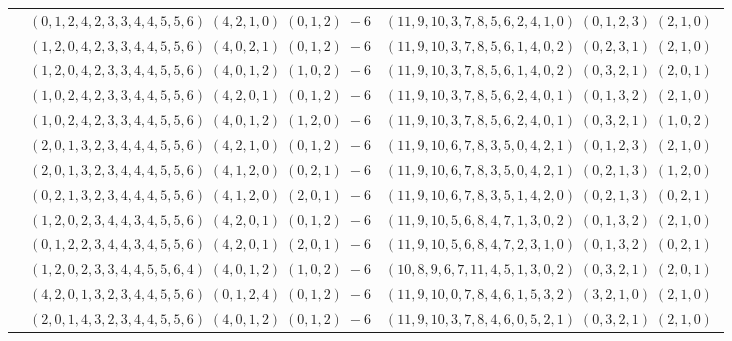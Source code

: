 \documentclass[11pt]{article}
\begin{document}
\begin{longtable}[l]{|c|c|c|}
 \cline{2-3} 
 & $(0 ,1 ,2 ,4 ,2 ,3 ,3 ,4 ,4 ,5 ,5 ,6) \;(4 ,2 ,1 ,0) \;(0 ,1 ,2) \;-6$ & $(11 ,9 ,10 ,3 ,7 ,8 ,5 ,6 ,2 ,4 ,1 ,0) \;(0 ,1 ,2 ,3) \;(2 ,1 ,0) \;$\\ 
 \cline{2-3} 
 & $(1 ,2 ,0 ,4 ,2 ,3 ,3 ,4 ,4 ,5 ,5 ,6) \;(4 ,0 ,2 ,1) \;(0 ,1 ,2) \;-6$ & $(11 ,9 ,10 ,3 ,7 ,8 ,5 ,6 ,1 ,4 ,0 ,2) \;(0 ,2 ,3 ,1) \;(2 ,1 ,0) \;$\\ 
 \cline{2-3} 
 & $(1 ,2 ,0 ,4 ,2 ,3 ,3 ,4 ,4 ,5 ,5 ,6) \;(4 ,0 ,1 ,2) \;(1 ,0 ,2) \;-6$ & $(11 ,9 ,10 ,3 ,7 ,8 ,5 ,6 ,1 ,4 ,0 ,2) \;(0 ,3 ,2 ,1) \;(2 ,0 ,1) \;$\\ 
 \cline{2-3} 
 & $(1 ,0 ,2 ,4 ,2 ,3 ,3 ,4 ,4 ,5 ,5 ,6) \;(4 ,2 ,0 ,1) \;(0 ,1 ,2) \;-6$ & $(11 ,9 ,10 ,3 ,7 ,8 ,5 ,6 ,2 ,4 ,0 ,1) \;(0 ,1 ,3 ,2) \;(2 ,1 ,0) \;$\\ 
 \cline{2-3} 
 & $(1 ,0 ,2 ,4 ,2 ,3 ,3 ,4 ,4 ,5 ,5 ,6) \;(4 ,0 ,1 ,2) \;(1 ,2 ,0) \;-6$ & $(11 ,9 ,10 ,3 ,7 ,8 ,5 ,6 ,2 ,4 ,0 ,1) \;(0 ,3 ,2 ,1) \;(1 ,0 ,2) \;$\\ 
 \cline{2-3} 
 & $(2 ,0 ,1 ,3 ,2 ,3 ,4 ,4 ,4 ,5 ,5 ,6) \;(4 ,2 ,1 ,0) \;(0 ,1 ,2) \;-6$ & $(11 ,9 ,10 ,6 ,7 ,8 ,3 ,5 ,0 ,4 ,2 ,1) \;(0 ,1 ,2 ,3) \;(2 ,1 ,0) \;$\\ 
 \cline{2-3} 
 & $(2 ,0 ,1 ,3 ,2 ,3 ,4 ,4 ,4 ,5 ,5 ,6) \;(4 ,1 ,2 ,0) \;(0 ,2 ,1) \;-6$ & $(11 ,9 ,10 ,6 ,7 ,8 ,3 ,5 ,0 ,4 ,2 ,1) \;(0 ,2 ,1 ,3) \;(1 ,2 ,0) \;$\\ 
 \cline{2-3} 
 & $(0 ,2 ,1 ,3 ,2 ,3 ,4 ,4 ,4 ,5 ,5 ,6) \;(4 ,1 ,2 ,0) \;(2 ,0 ,1) \;-6$ & $(11 ,9 ,10 ,6 ,7 ,8 ,3 ,5 ,1 ,4 ,2 ,0) \;(0 ,2 ,1 ,3) \;(0 ,2 ,1) \;$\\ 
 \cline{2-3} 
 & $(1 ,2 ,0 ,2 ,3 ,4 ,4 ,3 ,4 ,5 ,5 ,6) \;(4 ,2 ,0 ,1) \;(0 ,1 ,2) \;-6$ & $(11 ,9 ,10 ,5 ,6 ,8 ,4 ,7 ,1 ,3 ,0 ,2) \;(0 ,1 ,3 ,2) \;(2 ,1 ,0) \;$\\ 
 \cline{2-3} 
 & $(0 ,1 ,2 ,2 ,3 ,4 ,4 ,3 ,4 ,5 ,5 ,6) \;(4 ,2 ,0 ,1) \;(2 ,0 ,1) \;-6$ & $(11 ,9 ,10 ,5 ,6 ,8 ,4 ,7 ,2 ,3 ,1 ,0) \;(0 ,1 ,3 ,2) \;(0 ,2 ,1) \;$\\ 
 \cline{2-3} 
 & $(1 ,2 ,0 ,2 ,3 ,3 ,4 ,4 ,5 ,5 ,6 ,4) \;(4 ,0 ,1 ,2) \;(1 ,0 ,2) \;-6$ & $(10 ,8 ,9 ,6 ,7 ,11 ,4 ,5 ,1 ,3 ,0 ,2) \;(0 ,3 ,2 ,1) \;(2 ,0 ,1) \;$\\ 
 \cline{2-3} 
 & $(4 ,2 ,0 ,1 ,3 ,2 ,3 ,4 ,4 ,5 ,5 ,6) \;(0 ,1 ,2 ,4) \;(0 ,1 ,2) \;-6$ & $(11 ,9 ,10 ,0 ,7 ,8 ,4 ,6 ,1 ,5 ,3 ,2) \;(3 ,2 ,1 ,0) \;(2 ,1 ,0) \;$\\ 
 \cline{2-3} 
 & $(2 ,0 ,1 ,4 ,3 ,2 ,3 ,4 ,4 ,5 ,5 ,6) \;(4 ,0 ,1 ,2) \;(0 ,1 ,2) \;-6$ & $(11 ,9 ,10 ,3 ,7 ,8 ,4 ,6 ,0 ,5 ,2 ,1) \;(0 ,3 ,2 ,1) \;(2 ,1 ,0) \;$\\ 

\end{longtable}
\end{document}
